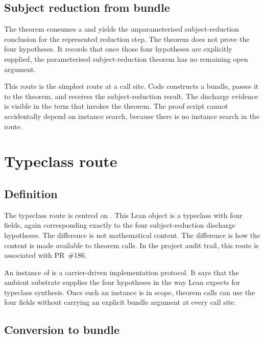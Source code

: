 \subsection{Subject reduction from bundle}
\label{subsec:sr-discharge-routes-subject-reduction-from-bundle}

The theorem
consumes a
and yields the unparameterised subject-reduction conclusion for the
represented reduction step.
The theorem does not prove the four hypotheses.
It records that once those four hypotheses are explicitly supplied,
the parameterised subject-reduction theorem has no remaining open
argument.

This route is the simplest route at a call site.
Code constructs a bundle, passes it to the theorem, and receives the
subject-reduction result.
The discharge evidence is visible in the term that invokes the theorem.
The proof script cannot accidentally depend on instance search, because
there is no instance search in the route.

\section{Typeclass route}
\label{sec:sr-discharge-routes-typeclass-route}

\subsection{Definition}
\label{subsec:sr-discharge-routes-typeclass-definition}

The typeclass route is centred on
.
This Lean object is a typeclass with four fields, again corresponding
exactly to the four subject-reduction discharge hypotheses.
The difference is not mathematical content.
The difference is how the content is made available to theorem calls.
In the project audit trail, this route is associated with PR~\#186.

An instance of
is a carrier-driven implementation protocol.
It says that the ambient substrate supplies the four hypotheses in the
way Lean expects for typeclass synthesis.
Once such an instance is in scope, theorem calls can use the four fields
without carrying an explicit bundle argument at every call site.

\subsection{Conversion to bundle}
\label{subsec:sr-discharge-routes-conversion-to-bundle}

